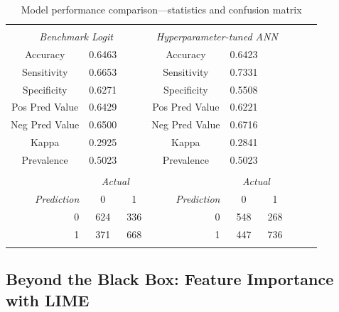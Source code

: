 \documentclass[12pt,a4paper]{article}
\begin{document}
\begin{table}[!htbp] \centering
\caption{Model performance comparison---statistics and confusion matrix}
\label{tab_comparemodel} 
{\small
\begin{tabular}{@{\extracolsep{5pt}} ccccccccc} 
\\[-1.8ex]\hline 
\hline \\[-1.8ex] 
\multicolumn{3}{c}{\textit{Benchmark Logit}} & \multicolumn{3}{c}{\textit{Hyperparameter-tuned ANN}} \\ \hline
Accuracy & 0.6463 &  & Accuracy & 0.6423 &  \\
Sensitivity & 0.6653 &  & Sensitivity & 0.7331 &  \\
Specificity & 0.6271 &  & Specificity & 0.5508 &  \\
Pos Pred Value & 0.6429 &  & Pos Pred Value & 0.6221 &  \\
Neg Pred Value & 0.6500 &  & Neg Pred Value & 0.6716 &  \\
Kappa & 0.2925 &  & Kappa & 0.2841 &  \\
Prevalence & 0.5023 &  & Prevalence & 0.5023 &  \\
\hline \\[-1.8ex] 
 & \multicolumn{2}{c}{\textit{Actual}} &  & \multicolumn{2}{c}{\textit{Actual}} \\
\multicolumn{1}{r}{\textit{Prediction}} & 0 & \multicolumn{1}{c}{1} & \multicolumn{1}{r}{\textit{Prediction}} & 0 & \multicolumn{1}{c}{1} \\ 
\multicolumn{1}{r}{0} & 624 & \multicolumn{1}{c}{336} & \multicolumn{1}{r}{0} & 548 & \multicolumn{1}{c}{268} \\
\multicolumn{1}{r}{1} & 371 & \multicolumn{1}{c}{668} & \multicolumn{1}{r}{1} & 447 & \multicolumn{1}{c}{736} \\
\hline \\[-1.8ex] 
\end{tabular}
}
\end{table}



\subsection{Beyond the Black Box: Feature Importance with LIME}
\end{document}
